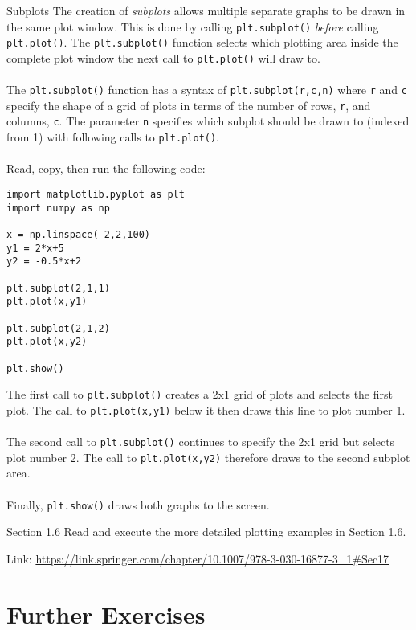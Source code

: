 \documentclass{lab}
\begin{document}
\begin{task}{Subplots}{}
The creation of \textit{subplots} allows multiple separate graphs to be drawn in the same plot window. This is done by calling \texttt{plt.subplot()} \textit{before} calling \texttt{plt.plot()}. The \texttt{plt.subplot()} function selects which plotting area inside the complete plot window the next call to \texttt{plt.plot()} will draw to.
\\~\\
The \texttt{plt.subplot()} function has a syntax of \texttt{plt.subplot(r,c,n)} where \texttt{r} and \texttt{c} specify the shape of a grid of plots in terms of the number of rows, \texttt{r}, and columns, \texttt{c}. The parameter \texttt{n} specifies which subplot should be drawn to (indexed from 1) with following calls to \texttt{plt.plot()}.
\\~\\
Read, copy, then run the following code:
\begin{lstlisting}
import matplotlib.pyplot as plt
import numpy as np

x = np.linspace(-2,2,100)
y1 = 2*x+5
y2 = -0.5*x+2

plt.subplot(2,1,1)
plt.plot(x,y1)

plt.subplot(2,1,2)
plt.plot(x,y2)

plt.show()
\end{lstlisting}
The first call to \texttt{plt.subplot()} creates a 2x1 grid of plots and selects the first plot. The call to \texttt{plt.plot(x,y1)} below it then draws this line to plot number 1.
\\~\\
The second call to \texttt{plt.subplot()} continues to specify the 2x1 grid but selects plot number 2. The call to \texttt{plt.plot(x,y2)} therefore draws to the second subplot area.
\\~\\
Finally, \texttt{plt.show()} draws both graphs to the screen.
\end{task}

\begin{task}{Section 1.6}{}
Read and execute the more detailed plotting examples in Section 1.6.

Link: \url{https://link.springer.com/chapter/10.1007/978-3-030-16877-3_1#Sec17}
\end{task}

\pagebreak
\section{Further Exercises}
\end{document}
